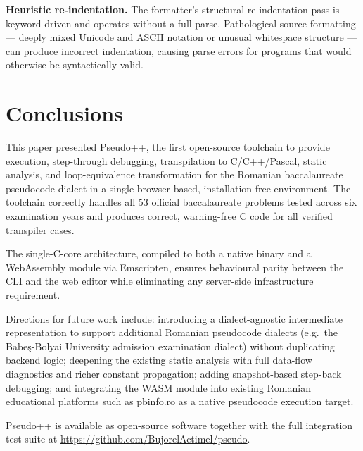 \documentclass[conference]{IEEEtran}
\begin{document}
\textbf{Heuristic re-indentation.}  The formatter's structural re-indentation
pass is keyword-driven and operates without a full parse.  Pathological source
formatting --- deeply mixed Unicode and ASCII notation or unusual whitespace
structure --- can produce incorrect indentation, causing parse errors for
programs that would otherwise be syntactically valid.

\section{Conclusions}
\label{sec:conclusions}

This paper presented Pseudo++, the first open-source toolchain to provide
execution, step-through debugging, transpilation to C/C++/Pascal, static
analysis, and loop-equivalence transformation for the Romanian baccalaureate
pseudocode dialect in a single browser-based, installation-free environment.
The toolchain correctly handles all 53 official baccalaureate problems tested
across six examination years and produces correct, warning-free C code for all
verified transpiler cases.

The single-C-core architecture, compiled to both a native binary and a
WebAssembly module via Emscripten, ensures behavioural parity between the CLI
and the web editor while eliminating any server-side infrastructure requirement.

Directions for future work include: introducing a dialect-agnostic intermediate
representation to support additional Romanian pseudocode dialects (e.g.\ the
Babe\c{s}-Bolyai University admission examination dialect) without duplicating
backend logic; deepening the existing static analysis with full data-flow
diagnostics and richer constant propagation; adding snapshot-based step-back
debugging; and integrating the WASM module into existing Romanian educational
platforms such as pbinfo.ro as a native pseudocode execution target.

Pseudo++ is available as open-source software together with the full
integration test suite at \url{https://github.com/BujorelActimel/pseudo}.



\end{document}
